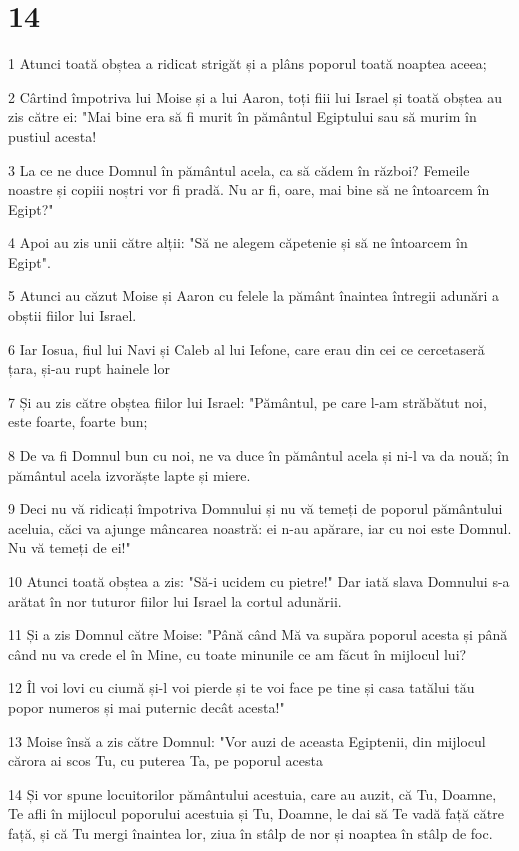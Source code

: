 \chapter{14}

\par 1 Atunci toată obștea a ridicat strigăt și a plâns poporul toată noaptea aceea;
\par 2 Cârtind împotriva lui Moise și a lui Aaron, toți fiii lui Israel și toată obștea au zis către ei: "Mai bine era să fi murit în pământul Egiptului sau să murim în pustiul acesta!
\par 3 La ce ne duce Domnul în pământul acela, ca să cădem în război? Femeile noastre și copiii noștri vor fi pradă. Nu ar fi, oare, mai bine să ne întoarcem în Egipt?"
\par 4 Apoi au zis unii către alții: "Să ne alegem căpetenie și să ne întoarcem în Egipt".
\par 5 Atunci au căzut Moise și Aaron cu felele la pământ înaintea întregii adunări a obștii fiilor lui Israel.
\par 6 Iar Iosua, fiul lui Navi și Caleb al lui Iefone, care erau din cei ce cercetaseră țara, și-au rupt hainele lor
\par 7 Și au zis către obștea fiilor lui Israel: "Pământul, pe care l-am străbătut noi, este foarte, foarte bun;
\par 8 De va fi Domnul bun cu noi, ne va duce în pământul acela și ni-l va da nouă; în pământul acela izvorăște lapte și miere.
\par 9 Deci nu vă ridicați împotriva Domnului și nu vă temeți de poporul pământului aceluia, căci va ajunge mâncarea noastră: ei n-au apărare, iar cu noi este Domnul. Nu vă temeți de ei!"
\par 10 Atunci toată obștea a zis: "Să-i ucidem cu pietre!" Dar iată slava Domnului s-a arătat în nor tuturor fiilor lui Israel la cortul adunării.
\par 11 Și a zis Domnul către Moise: "Până când Mă va supăra poporul acesta și până când nu va crede el în Mine, cu toate minunile ce am făcut în mijlocul lui?
\par 12 Îl voi lovi cu ciumă și-l voi pierde și te voi face pe tine și casa tatălui tău popor numeros și mai puternic decât acesta!"
\par 13 Moise însă a zis către Domnul: "Vor auzi de aceasta Egiptenii, din mijlocul cărora ai scos Tu, cu puterea Ta, pe poporul acesta
\par 14 Și vor spune locuitorilor pământului acestuia, care au auzit, că Tu, Doamne, Te afli în mijlocul poporului acestuia și Tu, Doamne, le dai să Te vadă față către față, și că Tu mergi înaintea lor, ziua în stâlp de nor și noaptea în stâlp de foc.
